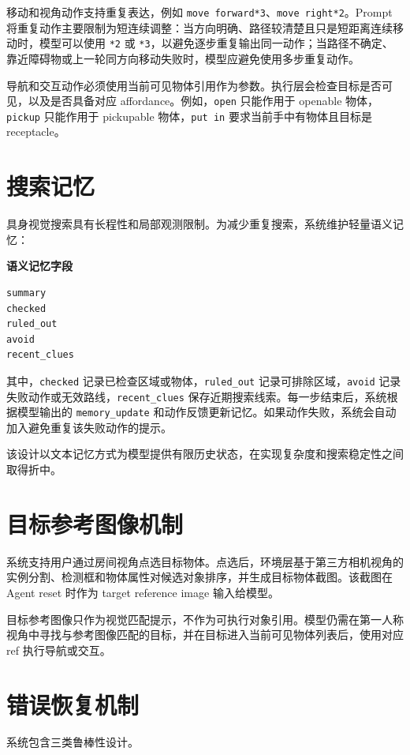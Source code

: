 \documentclass[UTF8,a4paper,12pt]{ctexart}
\begin{document}
移动和视角动作支持重复表达，例如 \texttt{move forward*3}、\texttt{move right*2}。Prompt 将重复动作主要限制为短连续调整：当方向明确、路径较清楚且只是短距离连续移动时，模型可以使用 \texttt{*2} 或 \texttt{*3}，以避免逐步重复输出同一动作；当路径不确定、靠近障碍物或上一轮同方向移动失败时，模型应避免使用多步重复动作。

导航和交互动作必须使用当前可见物体引用作为参数。执行层会检查目标是否可见，以及是否具备对应 affordance。例如，\texttt{open} 只能作用于 openable 物体，\texttt{pickup} 只能作用于 pickupable 物体，\texttt{put in} 要求当前手中有物体且目标是 receptacle。

\section{搜索记忆}

具身视觉搜索具有长程性和局部观测限制。为减少重复搜索，系统维护轻量语义记忆：

\noindent\textbf{语义记忆字段}
\begin{lstlisting}
summary
checked
ruled_out
avoid
recent_clues
\end{lstlisting}

其中，\texttt{checked} 记录已检查区域或物体，\texttt{ruled\_out} 记录可排除区域，\texttt{avoid} 记录失败动作或无效路线，\texttt{recent\_clues} 保存近期搜索线索。每一步结束后，系统根据模型输出的 \texttt{memory\_update} 和动作反馈更新记忆。如果动作失败，系统会自动加入避免重复该失败动作的提示。

该设计以文本记忆方式为模型提供有限历史状态，在实现复杂度和搜索稳定性之间取得折中。

\section{目标参考图像机制}

系统支持用户通过房间视角点选目标物体。点选后，环境层基于第三方相机视角的实例分割、检测框和物体属性对候选对象排序，并生成目标物体截图。该截图在 Agent reset 时作为 target reference image 输入给模型。

目标参考图像只作为视觉匹配提示，不作为可执行对象引用。模型仍需在第一人称视角中寻找与参考图像匹配的目标，并在目标进入当前可见物体列表后，使用对应 ref 执行导航或交互。

\section{错误恢复机制}

系统包含三类鲁棒性设计。
\end{document}
